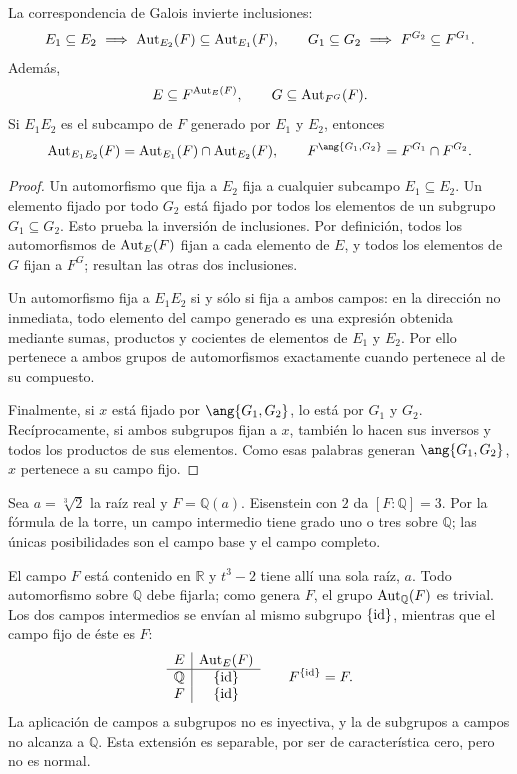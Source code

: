 \begin{lema}\label{lema:C26-correspondencia}
La correspondencia de Galois invierte inclusiones:
\[
E_1\subseteq E_2\ \Longrightarrow\ \Aut_{E_2}(F)\subseteq\Aut_{E_1}(F),
\qquad
G_1\subseteq G_2\ \Longrightarrow\ F^{G_2}\subseteq F^{G_1}.
\]
Además,
\[
E\subseteq F^{\operatorname{Aut}_E(F)},\qquad G\subseteq\operatorname{Aut}_{F^G}(F).
\]
Si $E_1E_2$ es el subcampo de $F$ generado por $E_1$ y $E_2$, entonces
\[
\Aut_{E_1E_2}(F)=\Aut_{E_1}(F)\cap\Aut_{E_2}(F),
\qquad
F^{\ang{G_1,G_2}}=F^{G_1}\cap F^{G_2}.
\]
\end{lema}
\begin{proof}
Un automorfismo que fija a $E_2$ fija a cualquier subcampo $E_1\subseteq E_2$. Un elemento fijado por todo $G_2$ está fijado por todos los elementos de un subgrupo $G_1\subseteq G_2$. Esto prueba la inversión de inclusiones. Por definición, todos los automorfismos de $\operatorname{Aut}_E(F)$ fijan a cada elemento de $E$, y todos los elementos de $G$ fijan a $F^G$; resultan las otras dos inclusiones.

Un automorfismo fija a $E_1E_2$ si y sólo si fija a ambos campos: en la dirección no inmediata, todo elemento del campo generado es una expresión obtenida mediante sumas, productos y cocientes de elementos de $E_1$ y $E_2$. Por ello pertenece a ambos grupos de automorfismos exactamente cuando pertenece al de su compuesto.

Finalmente, si $x$ está fijado por $\ang{G_1,G_2}$, lo está por $G_1$ y $G_2$. Recíprocamente, si ambos subgrupos fijan a $x$, también lo hacen sus inversos y todos los productos de sus elementos. Como esas palabras generan $\ang{G_1,G_2}$, $x$ pertenece a su campo fijo.
\end{proof}

\begin{ejem}\label{ejem:C26-cubica-real}
Sea $a=\sqrt[3]{2}$ la raíz real y $F=\mathbb Q(a)$. Eisenstein con $2$ da $[F:\mathbb Q]=3$. Por la fórmula de la torre, un campo intermedio tiene grado uno o tres sobre $\mathbb Q$; las únicas posibilidades son el campo base y el campo completo.

El campo $F$ está contenido en $\mathbb R$ y $t^3-2$ tiene allí una sola raíz, $a$. Todo automorfismo sobre $\mathbb Q$ debe fijarla; como genera $F$, el grupo $\operatorname{Aut}_{\mathbb Q}(F)$ es trivial. Los dos campos intermedios se envían al mismo subgrupo $\{\operatorname{id}\}$, mientras que el campo fijo de éste es $F$:
\[
\begin{array}{c|c}
E&\operatorname{Aut}_E(F)\\\hline
\mathbb Q&\{\operatorname{id}\}\\
F&\{\operatorname{id}\}
\end{array}
\qquad F^{\{\operatorname{id}\}}=F.
\]
La aplicación de campos a subgrupos no es inyectiva, y la de subgrupos a campos no alcanza a $\mathbb Q$. Esta extensión es separable, por ser de característica cero, pero no es normal.
\end{ejem}


